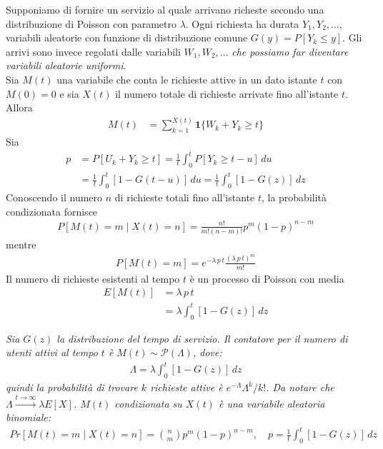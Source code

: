 \documentclass{article}
\begin{document}
Supponiamo di fornire un servizio al quale arrivano richeste secondo una distribuzione di Poisson con parametro $\lambda$. Ogni richiesta ha durata $Y_1,Y_2,\hdots$, variabili aleatorie con funzione di distribuzione comune $G(y) = P[Y_k \le y]$. Gli arrivi sono invece regolati dalle variabili $W_1,W_2,\hdots$ \textit{che possiamo far diventare variabili aleatorie uniformi}.\\
Sia $M(t)$ una variabile che conta le richieste attive in un dato istante $t$ con $M(0) = 0$ e sia $X(t)$ il numero totale di richieste arrivate fino all'istante $t$. Allora
\begin{align*}
M(t) &= \sum_{k=1}^{X(t)} \textbf{1}\{W_k + Y_k \ge t\}
\end{align*}
Sia
\begin{align*}
p &= P[U_k + Y_k \ge t] = \frac{1}{t}\int_0^t P[Y_k \ge t - u]\,du\\
&= \frac{1}{t}\int_0^t [1-G(t-u)]\,du = \frac{1}{t} \int_0^t [1-G(z)]\,dz
\end{align*}
Conoscendo il numero $n$ di richieste totali fino all'istante $t$, la probabilità condizionata fornisce
\begin{align*}
P[M(t) = m \mid X(t) = n] = \frac{n!}{m!(n-m)!} p^m (1-p)^{n-m}
\end{align*}
mentre
\begin{align*}
P[M(t) = m] = e^{-\lambda\,p\,t}\frac{(\lambda\,p\,t)^m}{m!}
\end{align*}
Il numero di richieste esistenti al tempo $t$ è un processo di Poisson con media
\begin{align*}
E[M(t)] &= \lambda\,p\,t\\
&= \lambda \int_0^t [1-G(z)]\,dz
\end{align*}

\emph{Sia $G(z)$ la distribuzione del tempo di servizio.
Il contatore per il numero di utenti attivi al tempo $t$ è $M(t) \sim \mathcal{P}(\Lambda)$, dove:
\begin{align*}
\Lambda = \lambda \int_0^t [1-G(z)]\,dz
\end{align*}
quindi la probabilità di trovare $k$ richieste attive è $e^{-\Lambda}\Lambda^k/k!$.
Da notare che $\Lambda \xrightarrow{t\to\infty} \lambda E[X]$.
$M(t)$ condizionata su $X(t)$ è una variabile aleatoria binomiale:
\begin{align*}
Pr[M(t) = m\mid X(t) = n] = \binom{n}{m} p^m (1-p)^{n-m}, \quad p = \frac{1}{t} \int_0^t [1-G(z)]\,dz
\end{align*}}
\end{document}
